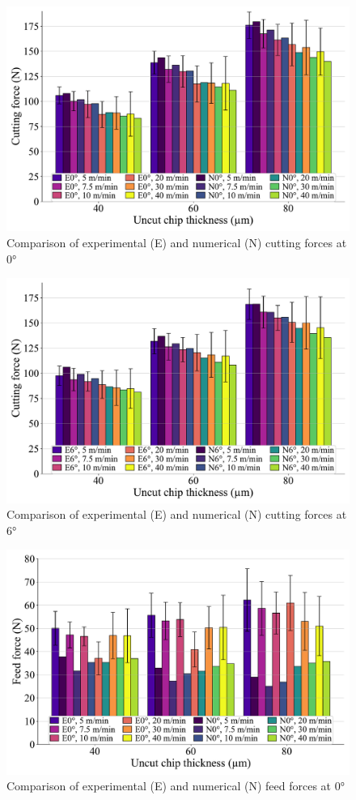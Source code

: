 \documentclass[final,5p,times,twocolumn]{elsarticle}
\begin{document}
\begin{figure}[h]
\centering
\includegraphics[width=\columnwidth]{Figures/Fx_0}
\caption{Comparison of experimental (E) and numerical (N) cutting forces at 0°}
\label{Fx_0}
\end{figure}

\begin{figure}[h]
\centering
\includegraphics[width=\columnwidth]{Figures/Fx_6}
\caption{Comparison of experimental (E) and numerical (N) cutting forces at 6°}
\label{Fx_6}
\end{figure}

\begin{figure}[h]
\centering
\includegraphics[width=\columnwidth]{Figures/Fy_0}
\caption{Comparison of experimental (E) and numerical (N) feed forces at 0°}
\label{Fy_0}
\end{figure}
\end{document}

